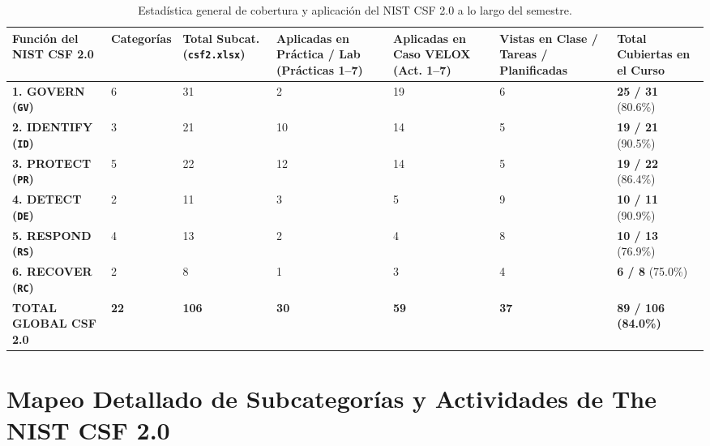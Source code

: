 \documentclass[letterpaper,11pt]{article}
\begin{document}
\begin{table}[H]
\centering
\footnotesize
\setlength{\tabcolsep}{5pt}
\renewcommand{\arraystretch}{1.28}
\caption{Estadística general de cobertura y aplicación del NIST CSF 2.0 a lo largo del semestre.}
\label{tab:resumen-cobertura}
\begin{tabular}{|L{3.6cm}|C{1.4cm}|C{1.6cm}|C{2.4cm}|C{2.4cm}|C{2.4cm}|C{1.8cm}|}
\hline
{}
\textbf{Función del NIST CSF 2.0} & \textbf{Categorías} & \textbf{Total Subcat. (\texttt{csf2.xlsx})} & \textbf{Aplicadas en Práctica / Lab (Prácticas 1--7)} & \textbf{Aplicadas en Caso VELOX (Act. 1--7)} & \textbf{Vistas en Clase / Tareas / Planificadas} & \textbf{Total Cubiertas en el Curso} \\
\hline
{}
\textbf{1. GOVERN (\texttt{GV})} & 6 & 31 & 2 & 19 & 6 & \textbf{25 / 31} (80.6\%) \\
\hline
{}
\textbf{2. IDENTIFY (\texttt{ID})} & 3 & 21 & 10 & 14 & 5 & \textbf{19 / 21} (90.5\%) \\
\hline
{}
\textbf{3. PROTECT (\texttt{PR})} & 5 & 22 & 12 & 14 & 5 & \textbf{19 / 22} (86.4\%) \\
\hline
{}
\textbf{4. DETECT (\texttt{DE})} & 2 & 11 & 3 & 5 & 9 & \textbf{10 / 11} (90.9\%) \\
\hline
{}
\textbf{5. RESPOND (\texttt{RS})} & 4 & 13 & 2 & 4 & 8 & \textbf{10 / 13} (76.9\%) \\
\hline
{}
\textbf{6. RECOVER (\texttt{RC})} & 2 & 8 & 1 & 3 & 4 & \textbf{6 / 8} (75.0\%) \\
\hline
{}
\textbf{TOTAL GLOBAL CSF 2.0} & \textbf{22} & \textbf{106} & \textbf{30} & \textbf{59} & \textbf{37} & \textbf{89 / 106 (84.0\%)} \\
\hline
\end{tabular}
\vspace{0.15cm}
\par{}
\end{table}

\section{Mapeo Detallado de Subcategorías y Actividades de The NIST CSF 2.0}
\end{document}
